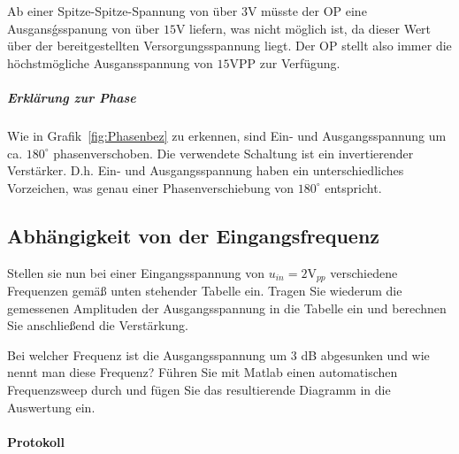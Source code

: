 \documentclass[10pt]{scrreprt}
\begin{document}
    Ab einer Spitze-Spitze-Spannung von über $3\si{\volt}$ müsste der OP eine
    Ausgansǵsspanung von über $15\si{\volt}$ liefern, was nicht möglich ist, da
    dieser Wert über der bereitgestellten Versorgungsspannung liegt. Der OP stellt
    also immer die höchstmögliche Ausgansspannung von $15\si{\volt}$PP zur Verfügung.

    \subparagraph{Erklärung zur Phase}
    Wie in Grafik~\ref{fig:Phasenbez} zu erkennen, sind Ein- und Ausgangsspannung
    um ca. $180^\circ$ phasenverschoben. Die verwendete Schaltung ist ein invertierender
    Verstärker. D.h. Ein- und Ausgangsspannung haben ein unterschiedliches Vorzeichen,
    was genau einer Phasenverschiebung von $180^\circ$ entspricht.


    \subsection{Abhängigkeit von der Eingangsfrequenz}
    Stellen sie nun bei einer Eingangsspannung von $u_{in} = 2\si{\volt}_{pp}$ verschiedene Frequenzen
    gemäß unten stehender Tabelle ein. Tragen Sie wiederum die gemessenen Amplituden der
    Ausgangsspannung in die Tabelle ein und berechnen Sie anschließend die Verstärkung.

    Bei welcher Frequenz ist die Ausgangsspannung um 3 dB abgesunken und wie nennt man
    diese Frequenz?
    Führen Sie mit Matlab einen automatischen Frequenzsweep durch und fügen Sie das
    resultierende Diagramm in die Auswertung ein.

    \paragraph{Protokoll}
    $ $
\end{document}
